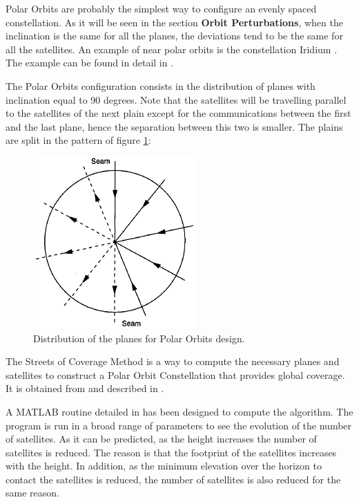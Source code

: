 Polar Orbits are probably the simplest way to configure an evenly spaced constellation. As it will be seen in the section \textbf{Orbit Perturbations}, when the inclination is the same for all the planes, the deviations tend to be the same for all the satellites. An example of near polar orbits is the constellation Iridium \cite{Iridium}. The example can be found in detail in \cite[Chapter 3, Section 2]{annex1}.

\begin{minipage}{0.45\textwidth}
The Polar Orbits configuration consists in the distribution of planes with inclination equal to 90 degrees. Note that the satellites will be travelling parallel to the satellites of the next plain except for the communications between the first and the last plane, hence the separation between this two is smaller. The plains are split in the pattern of figure \ref{fig:polardist}:
\end{minipage}
\vline
\begin{minipage}{0.45\textwidth}
\begin{figure}[H]
\begin{center}
\includegraphics[scale=0.40]{PolarOrbits/planeconfig.png}
\caption{Distribution of the planes for Polar Orbits design.}
\label{fig:polardist}
\end{center}
\end{figure}

\end{minipage}

The Streets of Coverage Method is a way to compute the necessary planes and satellites to construct a Polar Orbit Constellation that provides global coverage. It is obtained from \cite{Chobotov2002} and described in \cite[Chapter 3, Section 3]{annex1}.

A MATLAB routine detailed in \cite[Chapter 1, Section 3]{annex6} has been designed to compute the  algorithm. The program is run in a broad range of parameters to see the evolution of the number of satellites. As it can be predicted, as the height increases the number of satellites is reduced. The reason is that the footprint of the satellites increases with the height. In addition, as the minimum elevation over the horizon to contact the satellites is reduced, the number of satellites is also reduced for the same reason. 

